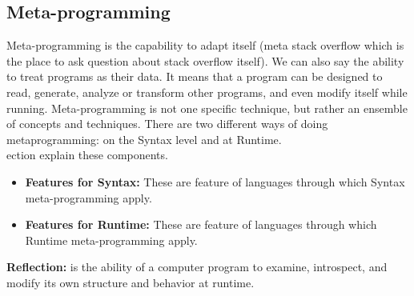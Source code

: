 \documentclass{sig-alternate}
\begin{document}
	\subsection{Meta-programming}
	Meta-programming is the capability to adapt itself (meta stack overflow which is the place to ask question about stack overflow itself). We can also say the ability to treat programs as their data. It means that a program can be designed to read, generate, analyze or transform other programs, and even modify itself while running. Meta-programming is not one specific technique, but rather an ensemble of concepts and techniques. There are two different ways of doing metaprogramming: on the Syntax level and at Runtime.\\
	ection explain these components.
	\begin{itemize}
		\item \textbf{Features for Syntax:} These are feature of languages through which Syntax meta-programming apply.
		\item \textbf{Features for Runtime:} These are feature of languages through which Runtime meta-programming apply.
	\end{itemize}
	\textbf{Reflection:} is the ability of a computer program to examine, introspect, and modify its own structure and behavior at runtime.
\end{document}
